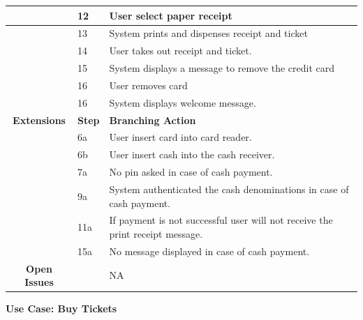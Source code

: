\documentclass[a4paper,12pt]{report}
\begin{document}
\begin{tabular}{ | c | p{2cm} | p{7cm} |}
	\hline
	&  12  & User select paper receipt \\
	\hline
	&  13  & System prints and dispenses receipt and ticket \\
	\hline
	&  14  & User takes out receipt and ticket. \\
	\hline
	&  15  & System displays a message to remove the credit card \\
	\hline
	&  16  & User removes card \\
	\hline
	&  16  & System displays welcome message. \\
	\hline
	\textbf{Extensions} & \textbf{Step} & \textbf{Branching Action} \\
	\hline
	&  6a  & User insert card into card reader. \\
	\hline
	&  6b  & User insert cash into the cash receiver. \\
	\hline
	&  7a  & No pin asked in case of cash payment. \\
	\hline
	&  9a  & System authenticated the cash denominations in case of cash payment. \\
	\hline
	&  11a  & If payment is not successful user will not receive the print receipt message. \\
	\hline
	&  15a  & No message displayed in case of cash payment. \\
	\hline
	\textbf{Open Issues} &    & NA \\
	\hline
	
\end{tabular}




\vspace{0.5cm}
\textbf{\large Use Case: Buy Tickets}
\\
\end{document}
